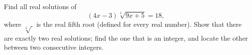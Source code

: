 Find all real solutions of
\[(4x-3)\sqrt[5]{9x+5}=18,\]
where $\sqrt[5]{\ }$ is the real fifth root (defined for every real number). Show that there are exactly two real solutions; find the one that is an integer, and locate the other between two consecutive integers.
